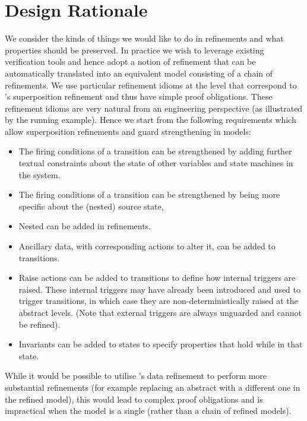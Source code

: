 
\section{Design Rationale}
\label{sec:discussion}
 
We consider the kinds of things we would like to do in \SCXML refinements and what properties should be preserved.
In practice we wish to leverage existing \EventB verification tools and hence adopt a notion of refinement that can be automatically translated into an equivalent \EventB model consisting of a chain of refinements.
We use particular refinement idioms at the \statechart level that correspond to \EventB's superposition refinement and thus have simple proof obligations. 
These refinement idioms are very natural from an engineering perspective (as illustrated by the running example).
Hence we start from the following requirements which allow superposition refinements and guard strengthening in \SCXML models:
\begin{itemize}
	\item The firing conditions of a transition can be strengthened by adding further textual constraints about the state of other variables and state machines in the system.
	\item The firing conditions of a transition can be strengthened by being more specific about the (nested) source state,
	\item Nested \Statecharts can be added in refinements.
	\item Ancillary data, with corresponding actions to alter it, can be added to transitions.
	\item Raise actions can be added to transitions to define how internal triggers are raised. These internal triggers may have already been introduced and used to trigger transitions, in which case they are non-deterministically raised at the abstract levels. (Note that external triggers are always unguarded and cannot be refined).
	\item Invariants can be added to states to specify properties that hold while in that state.
\end{itemize}
While it would be possible to utilise \EventB's data refinement to perform more substantial \statechart refinements (for example replacing an abstract \statechart with a different one in the refined model), this would lead to complex proof obligations and is impractical when the \SCXML model is a single \Statechart (rather than a chain of refined models).

